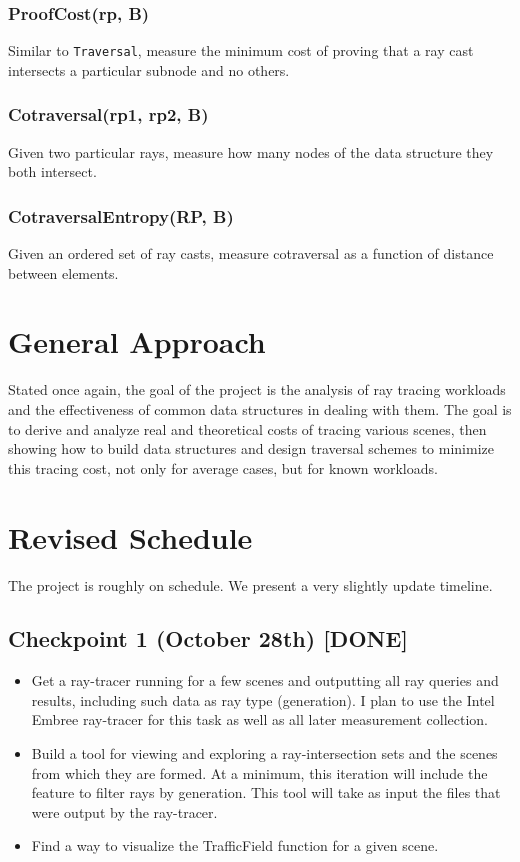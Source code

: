\documentclass[twocolumn]{article}
\begin{document}
\subsubsection{ProofCost(rp, B)}
Similar to \texttt{Traversal}, measure the minimum cost of proving that a ray cast intersects a particular subnode and no others.

\subsubsection{Cotraversal(rp1, rp2, B)}
Given two particular rays, measure how many nodes of the data structure they both intersect.

\subsubsection{CotraversalEntropy(RP, B)}
Given an ordered set of ray casts, measure cotraversal as a function of distance between elements.

\section{General Approach}
Stated once again, the goal of the project is the analysis of ray tracing workloads and the effectiveness of common data structures in dealing with them.  The goal is to derive and analyze real and theoretical costs of tracing various scenes, then showing how to build data structures and design traversal schemes to minimize this tracing cost, not only for average cases, but for known workloads.

\section{Revised Schedule}

The project is roughly on schedule.  We present a very slightly update timeline.

\subsection{Checkpoint 1 (October 28th) [DONE]}
\begin{itemize}
\item Get a ray-tracer running for a few scenes and outputting all ray queries and results, including such data as ray type (generation). I plan to use the Intel Embree ray-tracer for this task as well as all later measurement collection.
\item Build a tool for viewing and exploring a ray-intersection sets and the scenes from which they are formed. At a minimum, this iteration will include the feature to filter rays by generation. This tool will take as input the files that were output by the ray-tracer.
\item Find a way to visualize the TrafficField function for a given scene. 
\end{itemize}
\end{document}
